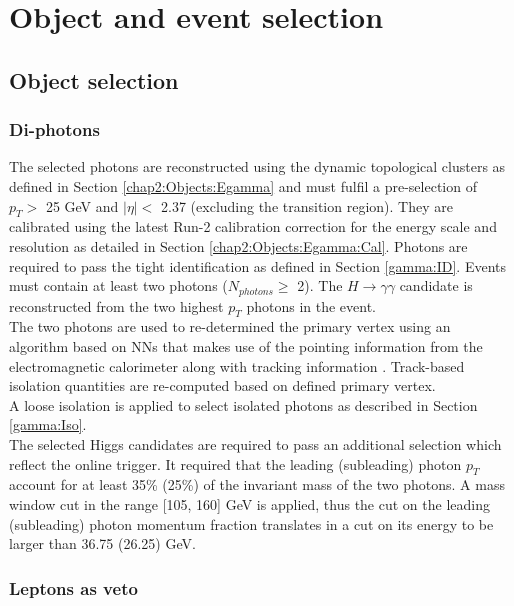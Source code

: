 \section{Object and event selection}
\label{HHyybb:ObjEvt}

\subsection{Object selection}
\label{HHyybb:ObjEvt:Obj}

\subsubsection{Di-photons}
\label{HHyybb:ObjEvt:Obj:gamma}
The selected photons are reconstructed using the dynamic topological clusters as defined in Section \ref{chap2:Objects:Egamma} and must fulfil a pre-selection of $p_T > $ 25 GeV and $|\eta| < $ 2.37 (excluding the transition region). They are calibrated using the latest Run-2 calibration correction for the energy scale and resolution as detailed in Section \ref{chap2:Objects:Egamma:Cal}. Photons are required to pass the tight identification as defined in Section \ref{gamma:ID}. Events must contain at least two photons ($N_{photons} \geq $ 2). The $H\to\gamma\gamma$ candidate is reconstructed from the two highest $p_T$ photons in the event.  \\ 
The two photons are used to re-determined the primary vertex using an algorithm based on NNs that makes use of the pointing information from the electromagnetic calorimeter along with tracking information \cite{DiPhotonVertex}. Track-based isolation quantities are re-computed based on defined primary vertex. \\
A loose isolation is applied to select isolated photons as described in Section \ref{gamma:Iso}.\\
The selected Higgs candidates are required to pass an additional selection which reflect the online trigger. It required that the leading (subleading) photon $p_T$ account for at least 35\% (25\%) of the invariant mass of the two photons. A mass window cut in the range [105, 160] GeV is applied, thus the cut on the leading (subleading) photon momentum fraction translates in a cut on its energy to be larger than 36.75 (26.25) GeV.

\subsubsection{Leptons as veto}
\label{HHyybb:ObjEvt:Obj:lepton}

